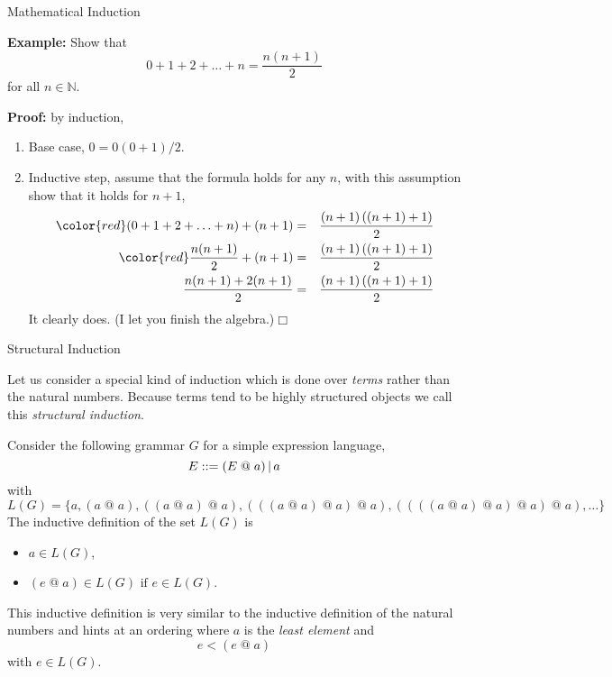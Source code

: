 \documentclass{beamer}
\begin{document}
\begin{frame}{Mathematical Induction}

\small
{\bf Example:} Show that 
\[
0+1+2+\ldots+n = \frac{n(n+1)}{2}
\]
for all $n\in \mathbb{N}$.

\vspace{.1in}

{\bf Proof:} by induction,
\begin{enumerate}
\item Base case, $0 = 0(0+1)/2$.
\item Inductive step, assume that the formula holds for any $n$, with this assumption show that
it holds for $n+1$,
{\tiny
\begin{eqnarray*}
{\color{red}(0+1+2+\ldots+n)}+(n+1) &=& \frac{(n+1)\left((n+1) + 1\right)}{2}\\
{\color{red}\frac{n(n+1)}{2}}+(n+1) &=& \frac{(n+1)\left((n+1) + 1\right)}{2}\\
\frac{n(n+1)+2(n+1)}{2} &=& \frac{(n+1)\left((n+1) + 1\right)}{2}\\
\end{eqnarray*}
}
It clearly does. (I let you finish the algebra.)$\Box$
\end{enumerate}

\end{frame}

\begin{frame}{Structural Induction}

\scriptsize
Let us consider a special kind of induction which is done over {\em terms} rather than the natural numbers.
Because terms tend to be highly structured objects we call this {\em structural induction}.

\vspace{.1in}
Consider the following grammar $G$ for a simple expression language,
\[
E ::= ( E \; @\; a ) \,|\, a 
\]
with
\[
L(G) = \{ a , (a\; @\; a), ((a\; @ \; a)\; @ \; a), (((a\; @ \; a)\; @ \; a)\; @ \; a),((((a\; @ \; a)\; @ \; a)\; @ \; a)\; @ \; a), \dots\}
\]
The inductive definition of the set $L(G)$ is
\begin{itemize}
\item $a\in L(G)$,
\item $(e\; @ \; a) \in L(G) \mbox{ if } e \in L(G)$.
\end{itemize}
This inductive definition is very similar to the inductive definition of the natural numbers and hints at an ordering 
where $a$ is the {\em least element} and
\[
e < (e \;@\; a)
\]
with $e \in L(G)$.
\end{frame}
\end{document}

